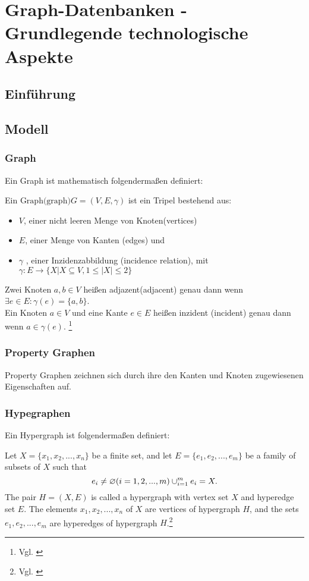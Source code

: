 \chapter{Graph-Datenbanken - Grundlegende technologische Aspekte}
\section{Einführung}
\section{Modell}
\subsection{Graph}
Ein Graph ist mathematisch folgendermaßen definiert: \\
\begin{definition}
	Ein $\text{Graph(graph)}G=(V,E,\gamma)$ ist ein Tripel bestehend aus:
	\begin{itemize}
		\item $V$, einer nicht leeren Menge von Knoten(vertices)
		\item $E$, einer Menge von Kanten (edges) und
		\item $\gamma$ , einer Inzidenzabbildung (incidence relation), mit\\
		$\gamma : E \longrightarrow \{X | X \subseteq V, 1 \leq |X| \leq 2\}$
	\end{itemize}
	Zwei Knoten $a,b \in V$ heißen adjazent(adjacent) genau dann wenn
	$\exists e \in E: \gamma(e)=\{a,b\}$. \\
	Ein Knoten $a \in V$ und eine Kante $e \in E$ heißen inzident (incident)
	genau dann wenn $a \in \gamma(e)$. \footnote{Vgl. \cite[Seite 21]{pbeck01}}
\end{definition}
\subsection{Property Graphen}
Property Graphen zeichnen sich durch ihre den Kanten und Knoten zugewiesenen Eigenschaften auf.
\subsection{Hypegraphen}
Ein Hypergraph ist folgendermaßen definiert:
\begin{definition}
	Let $X=\{x_{1}, x_{2},...,x_{n}\}$ be a finite set,
	and let $E=\{e_{1},e_{2},...,e_{m}\}$ be a family of subsets of $X$ such that
	\[e_{i} \neq \varnothing (i=1,2,...,m) \\
	\cup_{i=1}^{m}e_{i}=X.
	\]
	The pair $H=(X,E)$ is called a hypergraph with vertex set $X$
	and hyperedge set $E$. The elements $x_{1}, x_{2},...,x_{n}$ of $X$ are vertices
	of hypergraph $H$, and the sets $e_{1}, e_{2},...,e_{m}$ are hyperedges of hypergraph $H$.\footnote{Vgl. \cite[Seite 2]{zhang2018hypergraph}}
\end{definition}
